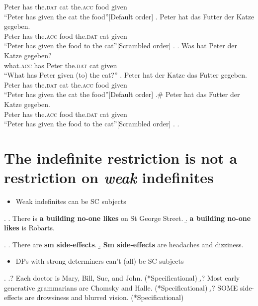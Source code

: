 \documentclass[GPFinal]{subfiles}
\begin{document}
Peter has the.\textsc{dat} cat the.\textsc{acc} food given\\
``Peter has given the cat the food''\hfill[Default order]
    \bg. Peter hat das Futter der Katze gegeben.\\
Peter has the.\textsc{acc} food the.\textsc{dat} cat given\\
``Peter has given the food to the cat''\hfill[Scrambled order]
    \z.
  \bg. Was hat Peter der Katze gegeben?\\
what.\textsc{acc} has Peter the.\textsc{dat} cat given\\
``What has Peter given (to) the cat?''
    \ag. Peter hat der Katze das Futter gegeben.\\
Peter has the.\textsc{dat} cat the.\textsc{acc} food given\\
``Peter has given the cat the food''\hfill[Default order]
    \bg.\# Peter hat das Futter der Katze gegeben.\\
Peter has the.\textsc{acc} food the.\textsc{dat} cat given\\
``Peter has given the food to the cat''\hfill[Scrambled order]
    \z.
  \z.

\section{The indefinite restriction is not a restriction on \textit{weak} indefinites}
\begin{itemize}
	\item Weak indefinites can be SC subjects
\end{itemize}
\ex. 
\a. There is \textbf{a building no-one likes} on St George Street.
\b. \textbf{a building no-one likes} is Robarts.

\ex.
\a. There are \textbf{sm side-effects}.
\b. \textbf{Sm side-effects} are headaches and dizziness. 

\begin{itemize}
	\item DPs with strong determiners can't (all) be SC subjects 
\end{itemize}
\ex.
\a.? Each doctor is Mary, Bill, Sue, and John. (*Specificational)
\b.? Most early generative grammarians are Chomsky and Halle. (*Specificational)
\b.? SOME side-effects are drowsiness and blurred vision. (*Specificational)
\end{document}
